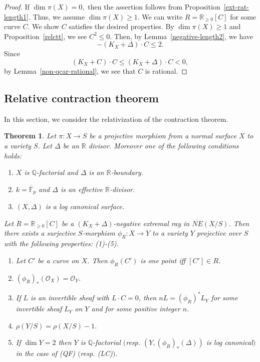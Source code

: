 \documentclass[12pt,twoside]{amsart}
\newtheorem{thm}{Theorem}[section]
\theoremstyle{definition}
\newcommand{\Q}{$\mathbb{Q}$}
\begin{document}
\begin{proof}
If $\dim \pi(X)=0,$ then the assertion follows from Proposition~\ref{ext-rat-length1}. 
Thus, we assume $\dim \pi(X)\geq 1.$ 
We can write  $R=\mathbb R_{\geq 0}[C]$ for some curve $C$. 
We show $C$ satisfies the desired properties. 
By $\dim \pi(X)\geq 1$ and Proposition~\ref{relctt}, we see $C^2\leq 0.$ 
Then, by Lemma~\ref{negative-length2}, we have 
$$-(K_X+\Delta)\cdot C\leq 2.$$ 
Since 
$$(K_X+C)\cdot C\leq (K_X+\Delta)\cdot C<0,$$
by Lemma~\ref{non-qcar-rational}, 
we see that $C$ is rational. 
\end{proof}


\subsection{Relative contraction theorem}

In this section, 
we consider the relativization of the contraction theorem. 

\begin{thm}\label{relcont}
Let $\pi:X \to S$ be a projective morphism 
from a normal surface $X$ to a variety $S$.
Let $\Delta$ be an $\mathbb{R}$ divisor. 
Moreover one of the following conditions holds{\em{:}}
\begin{enumerate}
\item[(QF)]{$X$ is \Q-factorial and $\Delta$ is an $\mathbb{R}$-boundary.}
\item[(FP)]{$k=\overline{\mathbb{F}}_p$ and $\Delta$ is an effective $\mathbb{R}$-divisor.}
\item[(LC)]{$(X, \Delta)$ is a log canonical surface.}
\end{enumerate}
Let $R=\mathbb{R}_{\geq 0}[C]$ be a $(K_X+\Delta)$-negative extremal ray 
in $\overline{NE}(X/S)$. 
Then there exists a surjective $S$-morphism $\phi_R: X \to Y$ 
to a variety $Y$ projective over $S$ with the following properties{\em{:}} 
{\em{(1)-(5)}}.
\begin{enumerate}
\item{Let $C'$ be a curve on $X$. 
Then $\phi_R(C')$ is one point iff $[C'] \in R$.}
\item{$(\phi_R)_*(\mathcal{O}_X)=\mathcal{O}_Y$.}
\item{If $L$ is an invertible sheaf with $L\cdot C=0$, 
then $nL=(\phi_R)^*L_Y$ for some invertible sheaf $L_Y$ on $Y$ and 
for some positive integer $n$.}
\item{$\rho(Y/S)=\rho(X/S)-1$.}
\item{If $\dim Y=2$ then 
$Y$ is \Q-factorial $($resp. $(Y, (\phi_R)_*(\Delta))$ 
is log canonical$)$ 
in the case of {\em (QF)} $($resp. {\em (LC)}$)$.}
\end{enumerate}
\end{thm}
\end{document}
